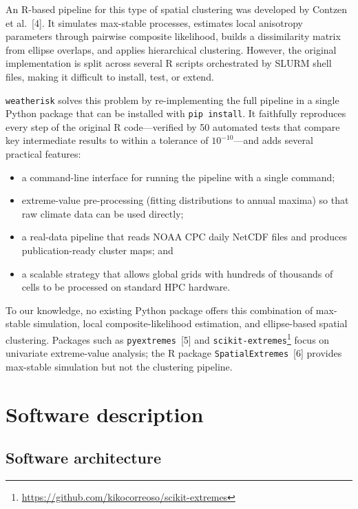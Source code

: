 \documentclass[preprint,12pt,a4paper]{elsarticle}
\begin{document}
An R-based pipeline for this type of spatial clustering was developed
by Contzen et al.~[4].  It simulates max-stable processes,
estimates local anisotropy parameters through pairwise composite
likelihood, builds a dissimilarity matrix from ellipse overlaps, and
applies hierarchical clustering.  However, the original
implementation is split across several R scripts orchestrated by
SLURM shell files, making it difficult to install, test, or extend.

\texttt{weatherisk} solves this problem by re-implementing the full
pipeline in a single Python package that can be installed with
\texttt{pip install}.  It faithfully reproduces every step of the
original R code---verified by 50 automated tests that compare
key intermediate results to within a tolerance of $10^{-10}$---and
adds several
practical features:
\begin{itemize}
\item a command-line interface for running the pipeline with a single
  command;
\item extreme-value pre-processing (fitting distributions to annual
  maxima) so that raw climate data can be used directly;
\item a real-data pipeline that reads NOAA CPC daily NetCDF files and
  produces publication-ready cluster maps; and
\item a scalable strategy that allows global grids with hundreds of
  thousands of cells to be processed on standard HPC hardware.
\end{itemize}

To our knowledge, no existing Python package offers this combination
of max-stable simulation, local composite-likelihood estimation, and
ellipse-based spatial clustering.  Packages such as
\texttt{pyextremes}~[5] and
\texttt{scikit-extremes}\footnote{\url{https://github.com/kikocorreoso/scikit-extremes}}
focus on univariate extreme-value analysis; the R package
\texttt{SpatialExtremes}~[6] provides max-stable simulation but
not the clustering pipeline.

\section{Software description}
\label{sec:description}

\subsection{Software architecture}
\label{sec:architecture}
\end{document}
